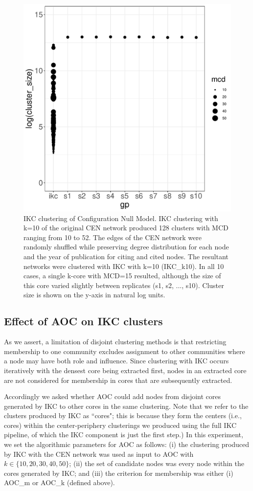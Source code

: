 \documentclass[12pt, oneside]{article}   	%
\begin{document}
\begin{figure}[H]
\centering
\includegraphics[width=0.6\linewidth]{shuffleplot.pdf} 
\captionsetup{width=0.9\textwidth}
\caption{IKC clustering of Configuration Null Model. IKC clustering with k=10 of the original CEN network produced 128 clusters  with MCD ranging from 10 to 52. The edges of the CEN network were randomly shuffled while preserving degree distribution for each node and the year of publication for citing and cited nodes. The resultant networks were clustered with IKC with k=10 (IKC\_k10).  In all 10 cases, a single k-core with MCD=15 resulted, although the size of this core varied slightly between replicates (s1, s2, ..., s10). Cluster size is shown on the y-axis in natural log units.}
\label{fig:shuffleplot}
\end{figure}
	
\subsection{Effect of AOC on IKC clusters} 
As we assert, a limitation of disjoint clustering methods is that restricting membership to one community excludes assignment to other communities where a node may have both role and influence. Since clustering with IKC occurs iteratively with the densest core being extracted first, nodes in an extracted core are not considered for membership in cores that are subsequently extracted.

Accordingly we asked whether AOC could add nodes from disjoint cores generated by IKC to other cores in the same clustering. Note that we refer to the clusters produced by IKC as ``cores"; this is because they form the centers (i.e., cores) within the center-periphery clusterings we produced using the full IKC pipeline, of which the IKC component is just the first step.)
In this experiment,  we set the algorithmic parameters for AOC as follows: (i) the clustering produced by IKC with the CEN network was used as input to AOC with $k \in \{10, 20, 30, 40, 50\}$; (ii) the set of candidate nodes was every node within the cores generated by IKC; and (iii) the criterion for membership was either (i) AOC\_m or AOC\_k (defined above).
\end{document}
